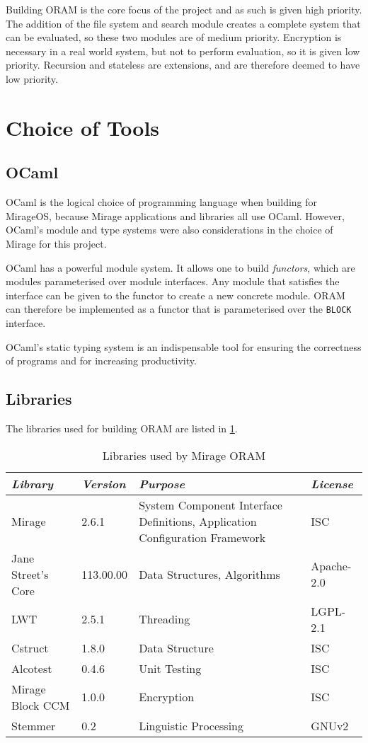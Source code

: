 \documentclass[12pt,a4paper,twoside,openright]{report}
\begin{document}
Building ORAM is the core focus of the project and as such is given high priority. The addition of the file system and search module creates a complete system that can be evaluated, so these two modules are of medium priority. Encryption is necessary in a real world system, but not to perform evaluation, so it is given low priority. Recursion and stateless are extensions, and are therefore deemed to have low priority.

\section{Choice of Tools}

\subsection{OCaml}

OCaml is the logical choice of programming language when building for MirageOS, because Mirage applications and libraries all use OCaml. However, OCaml's module and type systems were also considerations in the choice of Mirage for this project.

OCaml has a powerful module system. It allows one to build \emph{functors}, which are modules parameterised over module interfaces. Any module that satisfies the interface can be given to the functor to create a new concrete module. ORAM can therefore be implemented as a functor that is parameterised over the \texttt{BLOCK} interface.

OCaml's static typing system is an indispensable tool for ensuring the correctness of programs and for increasing productivity.

\subsection{Libraries}
\label{subsec:libraries}

The libraries used for building ORAM are listed in \cref{tab:libraries}.

\begin{table}[h]
\centering
\begin{tabularx}{\textwidth}{|l|l|X|l|}
\hline
\textit{Library} & \textit{Version} & \textit{Purpose} & \textit{License} \\
\hline \hline
Mirage & 2.6.1 & System Component Interface Definitions, Application Configuration Framework & ISC \\
\hline
Jane Street's Core & 113.00.00 & Data Structures, Algorithms & Apache-2.0 \\
\hline
LWT & 2.5.1 & Threading & LGPL-2.1 \\
\hline
Cstruct & 1.8.0 & Data Structure & ISC \\
\hline
Alcotest & 0.4.6 & Unit Testing & ISC \\
\hline
Mirage Block CCM & 1.0.0 & Encryption & ISC \\
\hline
Stemmer & 0.2 & Linguistic Processing & GNUv2 \\
\hline
\end{tabularx}
\caption{Libraries used by Mirage ORAM}
\label{tab:libraries}
\end{table}
\end{document}
